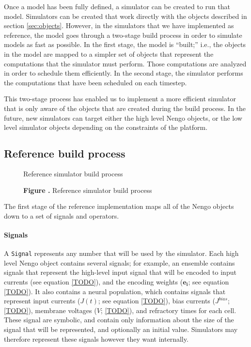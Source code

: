\documentclass{frontiersSCNS}
\begin{document}
Once a model has been fully defined,
a simulator can be created to
run that model.
Simulators can be created
that work directly with the
objects described in section \ref{sec:objects}.
However, in the simulators that we have implemented
as reference, the model goes through a
two-stage build process in order to
simulate models as fast as possible.
In the first stage,
the model is ``built;''
i.e., the objects in the model are mapped to a simpler
set of objects that represent the computations
that the simulator must perform.
Those computations are analyzed in order to
schedule them efficiently.
In the second stage,
the simulator performs the computations
that have been scheduled on each timestep.

This two-stage process has enabled us
to implement a more efficient simulator
that is only aware of
the objects that are created
during the build process.
In the future,
new simulators can target either
the high level Nengo objects,
or the low level simulator objects
depending on the constraints of the platform.

\subsection{Reference build process}

\begin{figure}
\begin{center}
  Reference simulator build process
\end{center}
 \textbf{\label{fig:01} Figure .}{
   Reference simulator build process}
\end{figure}

The first stage of the reference implementation
maps all of the Nengo objects
down to a set of signals and operators.

\paragraph{Signals}
A \texttt{Signal} represents any number that
will be used by the simulator.
Each high level Nengo object contains
several signals;
for example, an ensemble contains signals
that represent the high-level input
signal that will be encoded
to input currents (see equation \eqref{TODO}),
and the encoding weights
($\mathbf{e_i}$; see equation \eqref{TODO}).
It also contains a neural population,
which contains signals that represent
input currents
($J(t)$; see equation \eqref{TODO}),
bias currents ($J^{bias}$; \eqref{TODO}),
membrane voltages ($V$; \eqref{TODO}),
and refractory times for each cell.
These signal are symbolic,
and contain only information
about the size of the signal that will be represented,
and optionally an initial value.
Simulators may therefore represent
these signals however they want internally.
\end{document}
